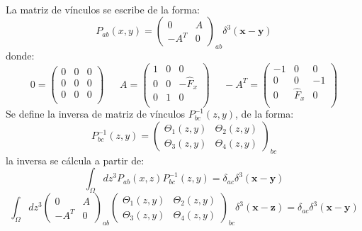 \documentclass[a4paper,12pt]{article}
\begin{document}
\\

La matriz de vínculos se escribe de la forma:
\begin{equation}
P_{ab}(x,y)=\left(\begin{matrix}
0 & A\\
-A^T & 0 
\end{matrix}\right)_{ab}\delta^3(\textbf{x}-\textbf{y}) 
\end{equation}
donde:
\begin{equation}
0=\left(\begin{matrix}
0 & 0 & 0 \\
 0 & 0 & 0\\
 0 & 0 & 0  \\
\end{matrix}\right) \ \ \ \ \ \ \ A=\left(\begin{matrix}
1 & 0 & 0 \\
 0 & 0 & -\hat{F}_x\\
 0 & 1 & 0  \\
\end{matrix}\right) \ \ \ \  \ \ -A^T=\left(\begin{matrix}
-1 & 0 & 0 \\
 0 & 0 & -1\\
 0 & \hat{F}_x & 0  \\
\end{matrix}\right)
\end{equation}
Se define la inversa de matriz de vínculos \mbox{\mbox{$P_{bc}^{-1}(z,y)$}}, de la forma: 
\begin{equation}
P_{bc}^{-1}(z,y)=\left(\begin{matrix}
 \Theta_1(z,y)&\Theta_2(z,y) \\
 \Theta_3(z,y)&\Theta_4(z,y)  
\end{matrix}\right)_{bc} 
\end{equation}
la inversa se cálcula a partir de: 
\begin{equation}
\int_\Omega dz^3P_{ab}(x,z)P_{bc}^{-1}(z,y)=\delta_{ac}\delta^3(\textbf{x}-\textbf{y})
\end{equation}
\begin{equation}
\int_\Omega dz^3\left(\begin{matrix}
0 & A\\
-A^T & 0 
\end{matrix}\right)_{ab}\left(\begin{matrix}
 \Theta_1(z,y)&\Theta_2(z,y) \\
 \Theta_3(z,y)&\Theta_4(z,y)  
\end{matrix}\right)_{bc} \delta^3(\textbf{x}-\textbf{z})=\delta_{ac}\delta^3(\textbf{x}-\textbf{y})  
\end{equation}
\end{document}
